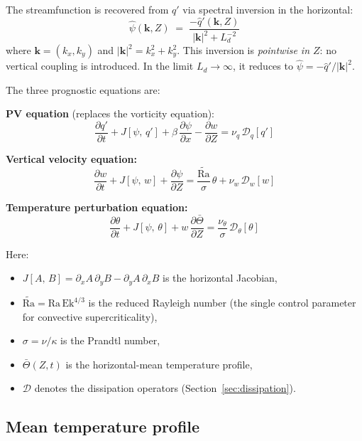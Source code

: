 \documentclass[11pt]{article}
\newcommand{\pderiv}[2]{\frac{\partial #1}{\partial #2}}
\newcommand{\Rav}{\widetilde{\mathrm{Ra}}}
\newcommand{\Ek}{\mathrm{Ek}}
\newcommand{\Ld}{L_d}
\newcommand{\kh}{|\bm{k}|}
\newcommand{\Jac}[2]{J\!\left[#1,\,#2\right]}
\newcommand{\hhat}[1]{\widehat{#1}}
\begin{document}
The streamfunction is recovered from $q'$ via spectral inversion in the horizontal:
\begin{equation}
\boxed{\hhat{\psi}(\bm{k},Z) \;=\; \frac{-\hhat{q}'(\bm{k},Z)}{\kh^2 + \Ld^{-2}}}
\label{eq:inversion}
\end{equation}
where $\bm{k} = (k_x, k_y)$ and $\kh^2 = k_x^2 + k_y^2$. This inversion is \emph{pointwise in $Z$}: no vertical coupling is introduced. In the limit $\Ld \to \infty$, it reduces to $\hhat\psi = -\hhat{q}'/\kh^2$.

The three prognostic equations are:

\vspace{0.5em}
\noindent\textbf{PV equation} (replaces the vorticity equation):
\begin{equation}
\boxed{\pderiv{q'}{t} + \Jac{\psi}{q'} + \beta\,\pderiv{\psi}{x} - \pderiv{w}{Z} = \nu_q\,\mathcal{D}_q[q']}
\label{eq:pv}
\end{equation}

\noindent\textbf{Vertical velocity equation:}
\begin{equation}
\boxed{\pderiv{w}{t} + \Jac{\psi}{w} + \pderiv{\psi}{Z} = \frac{\Rav}{\sigma}\,\theta + \nu_w\,\mathcal{D}_w[w]}
\label{eq:w}
\end{equation}

\noindent\textbf{Temperature perturbation equation:}
\begin{equation}
\boxed{\pderiv{\theta}{t} + \Jac{\psi}{\theta} + w\,\pderiv{\bar\Theta}{Z} = \frac{\nu_\theta}{\sigma}\,\mathcal{D}_\theta[\theta]}
\label{eq:theta}
\end{equation}

Here:
\begin{itemize}[nosep]
\item $\Jac{A}{B} = \partial_x A\,\partial_y B - \partial_y A\,\partial_x B$ is the horizontal Jacobian,
\item $\Rav = \mathrm{Ra}\,\Ek^{4/3}$ is the reduced Rayleigh number (the single control parameter for convective supercriticality),
\item $\sigma = \nu/\kappa$ is the Prandtl number,
\item $\bar\Theta(Z,t)$ is the horizontal-mean temperature profile,
\item $\mathcal{D}$ denotes the dissipation operators (Section~\ref{sec:dissipation}).
\end{itemize}

\subsection{Mean temperature profile}
\label{sec:mean_temp}
\end{document}
